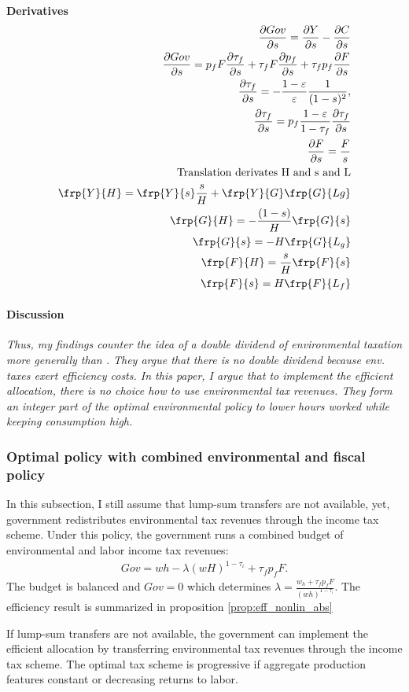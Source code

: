 \textbf{Derivatives}
\begin{align}
\frac{\partial Gov}{\partial s}=\frac{\partial Y}{\partial s}-\frac{\partial C}{\partial s}\\
\frac{\partial Gov}{\partial s}=p_f F \frac{\partial \tau_f}{\partial s}+\tau_f F \frac{\partial p_f}{\partial s}+\tau_f p_f \frac{\partial F}{\partial s}\\
\frac{\partial \tau_f}{\partial s}= -\frac{1-\varepsilon}{\varepsilon}\frac{1}{(1-s)^2}, \\
\frac{\partial \tau_f}{\partial s}=p_f\frac{1-\varepsilon}{1-\tau_f}\frac{\partial \tau_f}{\partial s}\\
\frac{\partial F}{\partial s}=\frac{F}{s}
\\
\text{Translation derivates H and s and L}\\
\frp{Y}{H}= \frp{Y}{s}\frac{s}{H}+\frp{Y}{G}\frp{G}{Lg}
\\
\frp{G}{H}=-\frac{(1-s)}{H}\frp{G}{s}
\\\frp{G}{s}=-H\frp{G}{L_g}\\
\frp{F}{H}=\frac{s}{H}\frp{F}{s}\\
\frp{F}{s}=H\frp{F}{L_f}
\end{align}

\paragraph{Discussion}
\textit{Thus, my findings counter the idea of a double dividend of environmental taxation more generally than \cite{LansBovenberg1994EnvironmentalTaxation}. They argue that there is no double dividend because env. taxes exert efficiency costs. In this paper, I argue that to implement the efficient allocation, there is no choice how to use environmental tax revenues. They form an integer part of the optimal environmental policy to lower hours worked while keeping consumption high.}

\subsubsection{Optimal policy with combined environmental and fiscal policy}

In this subsection, I still assume that lump-sum transfers are not available, yet, government redistributes environmental tax revenues through the income tax scheme.
Under this policy, the government runs a combined budget of environmental and labor income tax revenues:  
\begin{align}
Gov= wh-\lambda (wH)^{1-\tau_\iota}+\tau_f p_fF.
\end{align}
The budget is balanced and $Gov = 0$ which determines $\lambda=\frac{w_h + \tau_f p_f F}{(wh)^{1-\tau_{\iota}}}$. The efficiency result is summarized in proposition \ref{prop:eff_nonlin_abs}
\begin{prop}\label{prop:eff_nonlin_abs}
	If lump-sum transfers are not available, the government can implement the efficient allocation by  transferring environmental tax revenues through the income tax scheme. The optimal tax scheme is progressive if aggregate production features constant or decreasing returns to labor.
\end{prop}

